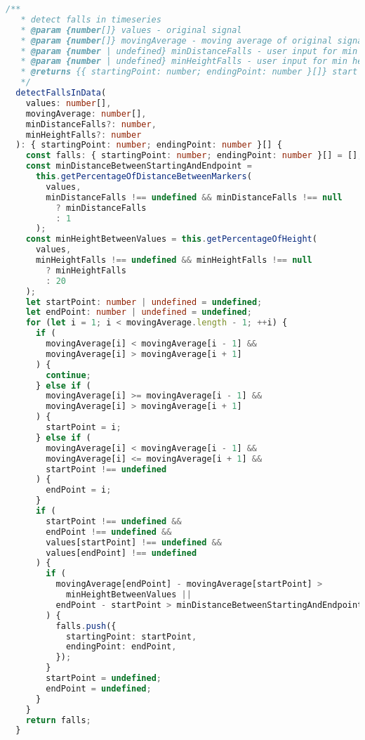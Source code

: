 \begin{lstlisting}[language=Typescript]
  /**
   * detect falls in timeseries
   * @param {number[]} values - original signal
   * @param {number[]} movingAverage - moving average of original signal
   * @param {number | undefined} minDistanceFalls - user input for min distance
   * @param {number | undefined} minHeightFalls - user input for min height
   * @returns {{ startingPoint: number; endingPoint: number }[]} start and end indices of falls
   */
  detectFallsInData(
    values: number[],
    movingAverage: number[],
    minDistanceFalls?: number,
    minHeightFalls?: number
  ): { startingPoint: number; endingPoint: number }[] {
    const falls: { startingPoint: number; endingPoint: number }[] = [];
    const minDistanceBetweenStartingAndEndpoint =
      this.getPercentageOfDistanceBetweenMarkers(
        values,
        minDistanceFalls !== undefined && minDistanceFalls !== null
          ? minDistanceFalls
          : 1
      );
    const minHeightBetweenValues = this.getPercentageOfHeight(
      values,
      minHeightFalls !== undefined && minHeightFalls !== null
        ? minHeightFalls
        : 20
    );
    let startPoint: number | undefined = undefined;
    let endPoint: number | undefined = undefined;
    for (let i = 1; i < movingAverage.length - 1; ++i) {
      if (
        movingAverage[i] < movingAverage[i - 1] &&
        movingAverage[i] > movingAverage[i + 1]
      ) {
        continue;
      } else if (
        movingAverage[i] >= movingAverage[i - 1] &&
        movingAverage[i] > movingAverage[i + 1]
      ) {
        startPoint = i;
      } else if (
        movingAverage[i] < movingAverage[i - 1] &&
        movingAverage[i] <= movingAverage[i + 1] &&
        startPoint !== undefined
      ) {
        endPoint = i;
      }
      if (
        startPoint !== undefined &&
        endPoint !== undefined &&
        values[startPoint] !== undefined &&
        values[endPoint] !== undefined 
      ) {
        if (
          movingAverage[endPoint] - movingAverage[startPoint] >
            minHeightBetweenValues ||
          endPoint - startPoint > minDistanceBetweenStartingAndEndpoint
        ) {
          falls.push({
            startingPoint: startPoint,
            endingPoint: endPoint,
          });
        }
        startPoint = undefined;
        endPoint = undefined;
      }
    }
    return falls;
  }
\end{lstlisting}
